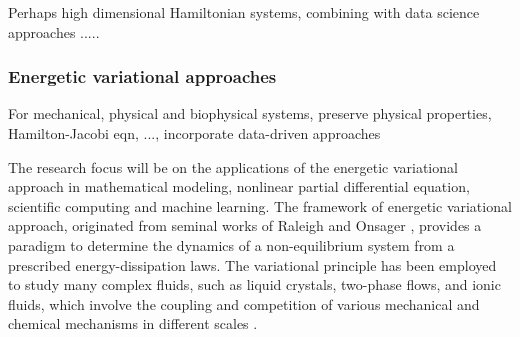 \documentclass[11pt]{article}
\begin{document}
 Perhaps high dimensional Hamiltonian systems, combining with data science approaches ..... 










\subsubsection{Energetic variational approaches}
For mechanical, physical and biophysical systems, preserve physical properties, Hamilton-Jacobi eqn, ...,  incorporate data-driven approaches


 The research focus will be on the applications of the energetic variational approach in mathematical modeling, nonlinear partial differential equation, scientific computing and machine learning. The framework of energetic variational approach, originated from seminal works of Raleigh \cite{strutt1871some} and Onsager \cite{onsager1931reciprocal,onsager1931reciprocal2}, provides a paradigm to determine the dynamics of a non-equilibrium system from a prescribed energy-dissipation laws.%
 The variational principle has been employed to study many complex fluids, such as liquid crystals, two-phase flows, and ionic fluids, which  involve the coupling and competition of various mechanical and chemical mechanisms in different scales \cite{lin2001static, feng2005energetic, LiLiZh05, Lin2007, liu2009introduction, du2009energetic, sun2009energetic, eisenberg2010energy, Giga2017, Liu2019, knopf2020phase}.
\end{document}
